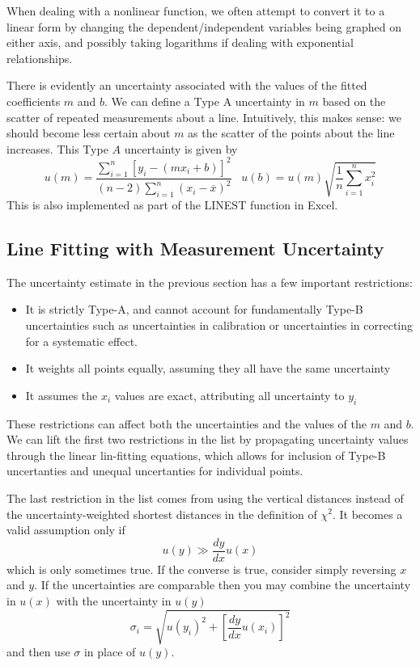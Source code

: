 When dealing with a nonlinear function, we often attempt to convert it to a linear form by changing the dependent/independent variables being graphed on either axis, and possibly taking logarithms if dealing with exponential relationships.

There is evidently an uncertainty associated with the values of the fitted coefficients $m$ and $b$. We can define a Type A uncertainty in $m$ based on the scatter of repeated measurements about a line. Intuitively, this makes sense: we should become less certain about $m$ as the scatter of the points about the line increases. This Type $A$ uncertainty is given by $$u(m) = \frac{\sum_{i=1}^n[y_i-(mx_i+b)]^2}{(n-2)\sum_{i=1}^n(x_i-\overline{x})^2}\;\;\;u(b) = u(m)\sqrt{\frac{1}{n}\sum_{i=1}^nx_i^2}$$ This is also implemented as part of the LINEST function in Excel.

\subsection{Line Fitting with Measurement Uncertainty}

The uncertainty estimate in the previous section has a few important restrictions:
\begin{itemize}
    \item It is strictly Type-A, and cannot account for fundamentally Type-B uncertainties such as uncertainties in calibration or uncertainties in correcting for a systematic effect.
    \item It weights all points equally, assuming they all have the same uncertainty
    \item It assumes the $x_i$ values are exact, attributing all uncertainty to $y_i$
\end{itemize}
These restrictions can affect both the uncertainties and the values of the $m$ and $b$. We can lift the first two restrictions in the list by propagating uncertainty values through the linear lin-fitting equations, which allows for inclusion of Type-B uncertanties and unequal uncertanties for individual points. 

The last restriction in the list comes from using the vertical distances instead of the uncertainty-weighted shortest distances in the definition of $\chi^2$. It becomes a valid assumption only if $$u(y) \gg\frac{dy}{dx}u(x)$$ which is only sometimes true. If the converse is true, consider simply reversing $x$ and $y$. If the uncertainties are comparable then you may combine the uncertainty in $u(x)$ with the uncertainty in $u(y)$ $$\sigma_i = \sqrt{u(y_i)^2+\left[\frac{dy}{dx}u(x_i)\right]^2}$$ and then use $\sigma$ in place of $u(y)$.

